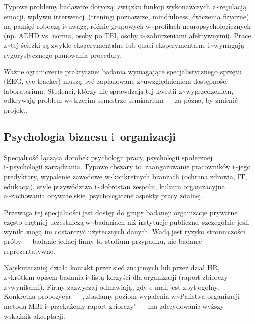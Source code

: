 \documentclass[12pt,a4paper,twoside,openany]{book}
\begin{document}
Typowe problemy badawcze dotyczą: związku funkcji wykonawczych z\textasciitilde{}regulacją emocji, wpływu interwencji (treningi poznawcze, mindfulness, ćwiczenia fizyczne) na pamięć roboczą i\textasciitilde{}uwagę, różnic grupowych w\textasciitilde{}profilach neuropsychologicznych (np. ADHD vs. norma, osoby po TBI, osoby z\textasciitilde{}zaburzeniami afektywnymi). Prace z\textasciitilde{}tej ścieżki są zwykle eksperymentalne lub quasi-eksperymentalne i\textasciitilde{}wymagają rygorystycznego planowania procedury.


Ważne ograniczenie praktyczne: badania wymagające specjalistycznego sprzętu (EEG, eye-tracker) muszą być zaplanowane z\textasciitilde{}uwzględnieniem dostępności laboratorium. Studenci, którzy nie sprawdzają tej kwestii z\textasciitilde{}wyprzedzeniem, odkrywają problem w\textasciitilde{}trzecim semestrze seminarium --- za późno, by zmienić projekt.


\subsection{Psychologia biznesu i~organizacji}


Specjalność łącząca dorobek psychologii pracy, psychologii społecznej i\textasciitilde{}psychologii zarządzania. Typowe obszary to: zaangażowanie pracowników i\textasciitilde{}jego predyktory, wypalenie zawodowe w\textasciitilde{}konkretnych branżach (ochrona zdrowia, IT, edukacja), style przywództwa i\textasciitilde{}dobrostan zespołu, kultura organizacyjna a\textasciitilde{}zachowania obywatelskie, psychologiczne aspekty pracy zdalnej.


Przewaga tej specjalności jest dostęp do grupy badanej: organizacje prywatne często chętniej uczestniczą w\textasciitilde{}badaniach niż instytucje publiczne, szczególnie jeśli wyniki mogą im dostarczyć użytecznych danych. Wadą jest ryzyko stronniczości próby --- badanie jednej firmy to studium przypadku, nie badanie reprezentatywne.


\begin{tipbox} Najskuteczniej działa kontakt przez sieć znajomych lub przez dział HR, z\textasciitilde{}krótkim opisem badania i\textasciitilde{}listą korzyści dla organizacji (raport zbiorczy z\textasciitilde{}wynikami). Firmy zazwyczaj odmawiają, gdy e-mail jest zbyt ogólny. Konkretna propozycja --- ,,zbadamy poziom wypalenia w\textasciitilde{}Państwa organizacji metodą MBI i\textasciitilde{}przekażemy raport zbiorczy'' --- ma zdecydowanie wyższy wskaźnik akceptacji.
\end{tipbox}
\end{document}
